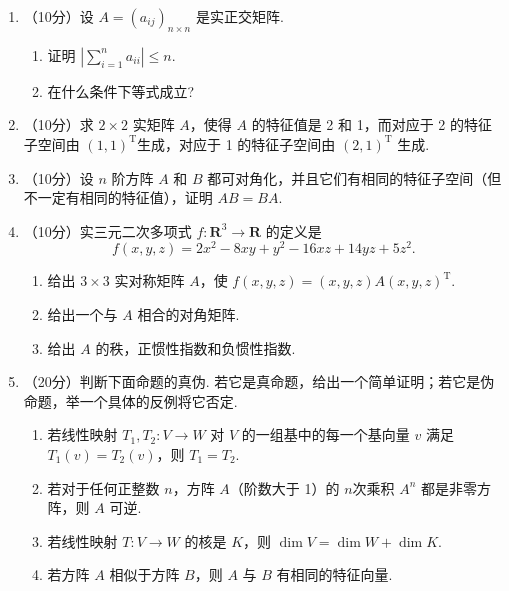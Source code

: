 \begin{enumerate}
    \item （10分）设 $A=(a_{ij})_{n\times n}$ 是实正交矩阵.
    \begin{enumerate}
        \item 证明 $\left\lvert\sum\limits_{i=1}^n{a_{ii}}\right\rvert \leqslant n$.

        \item 在什么条件下等式成立?
    \end{enumerate}

    \item （10分）求 $2\times 2$ 实矩阵 $A$，使得 $A$ 的特征值是 2 和 1，而对应于 2 的特征子空间由 $(1, 1)^\mathrm{T}$生成，对应于 1 的特征子空间由 $(2, 1)^\mathrm{T}$ 生成.

    \item （10分）设 $n$ 阶方阵 $A$ 和 $B$ 都可对角化，并且它们有相同的特征子空间（但不一定有相同的特征值），证明 $AB=BA$.

    \item （10分）实三元二次多项式 $f\colon \mathbf{R}^3\to \mathbf{R}$ 的定义是
    \[f(x,y,z) = 2x^2-8xy+y^2-16xz+14yz+5z^2.\]
    \begin{enumerate}
        \item 给出 $3\times 3$ 实对称矩阵 $A$，使 $f(x,y,z) = (x,y,z)A(x,y,z)^{\mathrm{T}}$.

        \item 给出一个与 $A$ 相合的对角矩阵.

        \item 给出 $A$ 的秩，正惯性指数和负惯性指数.
    \end{enumerate}

    \item （20分）判断下面命题的真伪. 若它是真命题，给出一个简单证明；若它是伪命题，举一个具体的反例将它否定.
    \begin{enumerate}
        \item 若线性映射 $T_1,T_2\colon V \to W$ 对 $V$ 的一组基中的每一个基向量 $v$ 满足 $T_1(v)=T_2(v)$，则 $T_1=T_2$.

        \item 若对于任何正整数 $n$，方阵 $A$（阶数大于 1）的 $n$次乘积 $A^n$ 都是非零方阵，则 $A$ 可逆.

        \item 若线性映射 $T\colon V\to W$ 的核是 $K$，则 $\dim V=\dim W+\dim K$.

        \item 若方阵 $A$ 相似于方阵 $B$，则 $A$ 与 $B$ 有相同的特征向量.
    \end{enumerate}
\end{enumerate}

\clearpage
